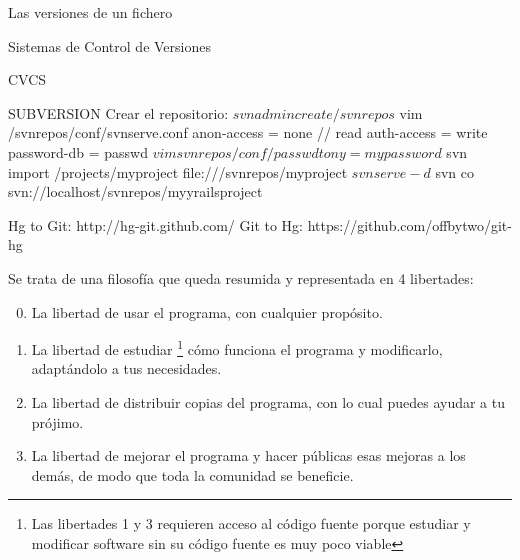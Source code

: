 \documentclass[spanish]{beamer}
\begin{document}
\begin{frame}{Las versiones de un fichero}
\begin{frame}{Sistemas de Control de Versiones}
        \begin{frame}{CVCS}
        
        
        
        
        
        SUBVERSION
            Crear el repositorio:
               $ svnadmin create /svnrepos
               $ vim /svnrepos/conf/svnserve.conf
                anon-access = none // read
                auth-access = write
                password-db = passwd
               $ vim svnrepos/conf/passwd
                tony = mypassword
               $ svn import /projects/myproject file:///svnrepos/myproject
               $ svnserve -d
               $ svn co svn://localhost/svnrepos/myyrailsproject

        
               
               
        Hg to Git: http://hg-git.github.com/
        Git to Hg: https://github.com/offbytwo/git-hg
        
        
        \end{frame}
        \begin{frame}{}
            Se trata de una filosofía que queda resumida y representada en 4 
            libertades:
            \begin{enumerate}
            \setcounter{enumi}{-1}
                \item La libertad de usar el programa, con cualquier propósito.
                \item La libertad de estudiar \footnote{Las libertades 1 y 3 
                requieren acceso al código fuente porque estudiar y modificar 
                software sin su código fuente es muy poco viable} cómo funciona 
                el programa y modificarlo, adaptándolo a tus necesidades.
                \item La libertad de distribuir copias del programa, con lo cual
                 puedes ayudar a tu prójimo.
                \item La libertad de mejorar el programa y hacer públicas esas 
                mejoras a los demás, de modo que toda la comunidad se beneficie.
            \end{enumerate}
        \end{frame}


\end{frame}
\end{frame}
\end{document}
